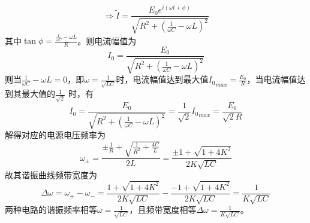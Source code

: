 \documentclass[10pt,a4paper]{article}
\theoremstyle{remark}
\begin{document}
\[
\Rightarrow \widetilde{I} = \frac{E_0e^{i(\omega t + \phi)}}{\sqrt{R^2 + (\frac{1}{\omega C} - \omega L)^2}}
\]
其中$\tan\phi = \frac{\frac{1}{\omega C} - \omega L}{R}$。则电流幅值为
\[
I_0 = \frac{E_0}{\sqrt{R^2 + (\frac{1}{\omega C} - \omega L)^2}}
\]
则当$\frac{1}{\omega C} - \omega L = 0$，即$\omega = \frac{1}{\sqrt{LC}}$时，电流幅值达到最大值${I_0}_{max} = \frac{E_0}{R}$，当电流幅值达到其最大值的$\frac{1}{\sqrt{2}}$ 时，有
\[
I_0 = \frac{E_0}{\sqrt{R^2 + (\frac{1}{\omega C} - \omega L)^2}} = \frac{1}{\sqrt{2}}{I_0}_{max} = \frac{E_0}{\sqrt{2}R}
\]
解得对应的电源电压频率为
\[
\omega_{\pm} = \frac{\pm\frac{1}{R} + \sqrt{\frac{1}{R^2} + \frac{4C}{L}}}{2L} = \frac{\pm1 + \sqrt{1+4K^2}}{2K\sqrt{LC}}
\]
故其谐振曲线频带宽度为
\[
\Delta\omega = \omega_+ - \omega_- = \frac{1 + \sqrt{1+4K^2}}{2K\sqrt{LC}} - \frac{- 1 + \sqrt{1+4K^2}}{2K\sqrt{LC}} = \frac{1}{K\sqrt{LC}}
\]
两种电路的谐振频率相等$\omega = \frac{1}{\sqrt{LC}}$，且频带宽度相等$\Delta\omega = \frac{1}{K\sqrt{LC}}$。
\section{}
\end{document}
